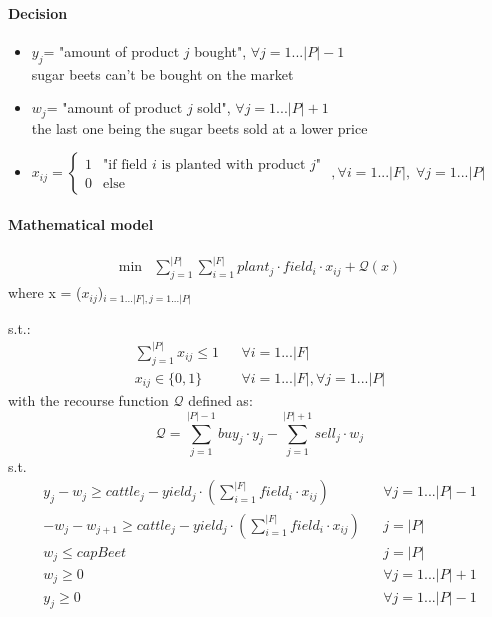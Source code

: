 \documentclass[12pt]{article}
\begin{document}
\paragraph{Decision}
\begin{itemize}
	\item $y_j$= "amount of product $j$ bought", $\forall j = 1...|P|-1$\\ sugar beets can't be bought on the market
	\item $w_j$= "amount of product $j$  sold", $\forall j = 1...|P|+1$\\ the last one being the sugar beets sold at a lower price
	\item $x_{ij}= \left\{
	\begin{array}{ll}
	1 & \text{"if field $i$ is planted with product $j$" }\\
	0 & \text{else}
	\end{array}, \forall i = 1...|F|,\; \forall j = 1...|P|
	 \right.$
\end{itemize}

\paragraph{Mathematical model}
\begin{align}
	\text{min} & \sum\limits_{j=1}^{|P|} \sum\limits_{i=1}^{|F|} plant_j \cdot field_i \cdot x_{ij} + \mathcal{Q}(x)
\end{align}
where x = ($x_{ij}$)$_{i = 1...|F|,j = 1...|P|}$

s.t.:
\begin{align}
\sum\limits_{j=1}^{|P|} x_{ij}\leq 1 & &\forall i=1...|F| \\
x_{ij} \in \{0,1\} & & \forall i=1...|F|, \forall j=1...|P|
\end{align}
with the recourse function $\mathcal{Q}$ defined as:
\begin{equation}
\mathcal{Q} = \sum\limits_{j=1}^{|P|-1} buy_j \cdot y_j - \sum\limits_{j=1}^{|P|+1} sell_j \cdot w_j
\end{equation}
s.t.\\
\begin{align}
y_j - w_j \geq cattle_j - yield_j \cdot (\sum\limits_{i=1}^{|F|} field_i \cdot x_{ij})&  & \forall j=1...|P|-1\\
- w_j- w_{j+1} \geq cattle_j - yield_j \cdot (\sum\limits_{i=1}^{|F|} field_i \cdot x_{ij}) & & j=|P|\\
w_{j} \leq capBeet & & j=|P|\\
w_j \geq 0 & & \forall j=1...|P|+1\\
y_j \geq 0 & & \forall j=1...|P|-1
\end{align}
\end{document}
